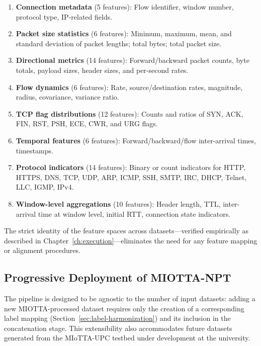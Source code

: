 \begin{enumerate}
    \item \textbf{Connection metadata} (5 features): Flow identifier, window number, protocol type, IP-related fields.
    \item \textbf{Packet size statistics} (6 features): Minimum, maximum, mean, and standard deviation of packet lengths; total bytes; total packet size.
    \item \textbf{Directional metrics} (14 features): Forward/backward packet counts, byte totals, payload sizes, header sizes, and per-second rates.
    \item \textbf{Flow dynamics} (6 features): Rate, source/destination rates, magnitude, radius, covariance, variance ratio.
    \item \textbf{TCP flag distributions} (12 features): Counts and ratios of SYN, ACK, FIN, RST, PSH, ECE, CWR, and URG flags.
    \item \textbf{Temporal features} (6 features): Forward/backward/flow inter-arrival times, timestamps.
    \item \textbf{Protocol indicators} (14 features): Binary or count indicators for HTTP, HTTPS, DNS, TCP, UDP, ARP, ICMP, SSH, SMTP, IRC, DHCP, Telnet, LLC, IGMP, IPv4.
    \item \textbf{Window-level aggregations} (10 features): Header length, TTL, inter-arrival time at window level, initial RTT, connection state indicators.
\end{enumerate}

The strict identity of the feature spaces across datasets---verified empirically as described in Chapter~\ref{ch:execution}---eliminates the need for any feature mapping or alignment procedures.

\subsection{Progressive Deployment of MIOTTA-NPT}
\label{subsec:progressive-miotta}

The pipeline is designed to be agnostic to the number of input datasets: adding a new MIOTTA-processed dataset requires only the creation of a corresponding label mapping (Section~\ref{sec:label-harmonization}) and its inclusion in the concatenation stage. This extensibility also accommodates future datasets generated from the MIoTTA-UPC testbed under development at the university.

